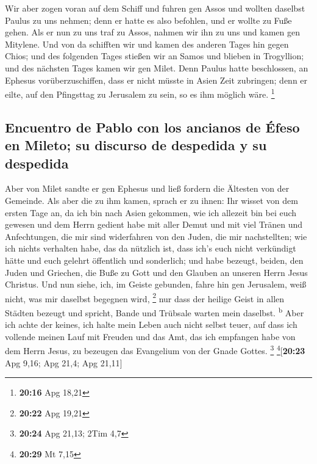  Wir aber zogen voran auf dem Schiff und fuhren gen Assos
und wollten daselbst Paulus zu uns nehmen; denn er hatte es also
befohlen, und er wollte zu Fuße gehen.  Als er nun zu uns
traf zu Assos, nahmen wir ihn zu uns und kamen gen Mitylene.
 Und von da schifften wir und kamen des anderen Tages hin
gegen Chios; und des folgenden Tages stießen wir an Samos und blieben in
Trogyllion; und des nächsten Tages kamen wir gen Milet. 
Denn Paulus hatte beschlossen, an Ephesus vorüberzuschiffen, dass er
nicht müsste in Asien Zeit zubringen; denn er eilte, auf den Pfingsttag
zu Jerusalem zu sein, so es ihm möglich wäre. \footnote{\textbf{20:16}
  Apg 18,21}

\hypertarget{encuentro-de-pablo-con-los-ancianos-de-uxe9feso-en-mileto-su-discurso-de-despedida-y-su-despedida}{%
\subsection{Encuentro de Pablo con los ancianos de Éfeso en Mileto; su
discurso de despedida y su
despedida}\label{encuentro-de-pablo-con-los-ancianos-de-uxe9feso-en-mileto-su-discurso-de-despedida-y-su-despedida}}

 Aber von Milet sandte er gen Ephesus und ließ fordern
die Ältesten von der Gemeinde.  Als aber die zu ihm
kamen, sprach er zu ihnen: Ihr wisset von dem ersten Tage an, da ich bin
nach Asien gekommen, wie ich allezeit bin bei euch gewesen
 und dem Herrn gedient habe mit aller Demut und mit viel
Tränen und Anfechtungen, die mir sind widerfahren von den Juden, die mir
nachstellten;  wie ich nichts verhalten habe, das da
nützlich ist, dass ich's euch nicht verkündigt hätte und euch gelehrt
öffentlich und sonderlich;  und habe bezeugt, beiden, den
Juden und Griechen, die Buße zu Gott und den Glauben an unseren Herrn
Jesus Christus.  Und nun siehe, ich, im Geiste gebunden,
fahre hin gen Jerusalem, weiß nicht, was mir daselbst begegnen wird,
\footnote{\textbf{20:22} Apg 19,21}  nur dass der heilige
Geist in allen Städten bezeugt und spricht, Bande und Trübsale warten
mein daselbst. \textsuperscript{b}  Aber ich achte der
keines, ich halte mein Leben auch nicht selbst teuer, auf dass ich
vollende meinen Lauf mit Freuden und das Amt, das ich empfangen habe von
dem Herrn Jesus, zu bezeugen das Evangelium von der Gnade Gottes.
\footnote{\textbf{20:24} Apg 21,13; 2Tim 4,7}
\footnote{\textbf{20:29} Mt 7,15}{[}\textbf{20:23} Apg 9,16; Apg 21,4;
Apg 21,11{]}

